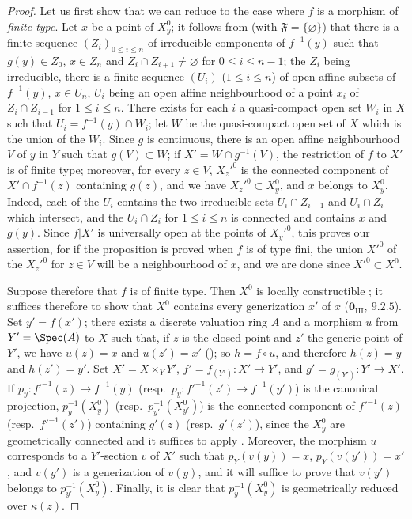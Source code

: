 \begin{proof}
Let us first show that we can reduce to the case where $f$ is a morphism of \emph{finite type}.
Let $x$ be a point of $X_y^0$; it follows from  (with $\mathfrak{F}=\{\varnothing\}$) that there is a finite sequence $(Z_i)_{0\leq i\leq n}$ of irreducible components of $f^{-1}(y)$ such that $g(y)\in Z_0$, $x\in Z_n$ and $Z_i\cap Z_{i+1}\neq\varnothing$ for $0\leq i\leq n-1$; the $Z_i$ being irreducible, there is a finite sequence $(U_i)$ ($1\leq i\leq n$) of open affine subsets of $f^{-1}(y)$, $x\in U_n$, $U_i$ being an open affine neighbourhood of a point $x_i$ of $Z_i\cap Z_{i-1}$ for $1\leq i\leq n$.
There exists for each $i$ a quasi-compact open set $W_i$ in $X$ such that $U_i=f^{-1}(y)\cap W_i$; let $W$ be the quasi-compact open set of $X$ which is the union of the $W_i$.
Since $g$ is continuous, there is an open affine neighbourhood $V$ of $y$ in $Y$ such that $g(V)\subset W$; if $X'=W\cap g^{-1}(V)$, the restriction of $f$ to $X'$ is of finite type; moreover, for every $z\in V$, $X_z'^0$ is the connected component of $X'\cap f^{-1}(z)$ containing $g(z)$, and we have $X_z'^0\subset X_y^0$, and $x$ belongs to $X_y^0$.
Indeed, each of the $U_i$ contains the two irreducible sets $U_i\cap Z_{i-1}$
and $U_i\cap Z_i$ which intersect, and the $U_i\cap Z_i$ for $1\leq i\leq n$ is connected and contains $x$ and $g(y)$.
Since $f|X'$ is universally open at the points of $X_y'^0$, this proves our assertion, for if the proposition is proved when $f$ is of type fini, the union $X'^0$ of the $X_z'^0$ for $z\in V$ will be a neighbourhood of $x$, and we are done since $X'^0\subset X^0$.

Suppose therefore that $f$ is of finite type.
Then $X^0$ is locally constructible ; it suffices therefore to show that $X^0$ contains every generization $x'$ of $x$ ($\mathbf{0}_{\mathrm{III}},~9.2.5$).
Set $y'=f(x')$; there exists a discrete valuation ring $A$ and a morphism $u$ from $Y'=\Spec(A)$ to $X$ such that, if $z$ is the closed point and $z'$ the generic point of $Y'$, we have $u(z)=x$ and $u(z')=x'$ (); so $h=f\circ u$, and therefore $h(z)=y$ and $h(z')=y'$.
Set $X'=X\times_Y Y'$, $f'=f_{(Y')}:X'\to Y'$, and $g'=g_{(Y')}:Y'\to X'$.
If $p_y:f'^{-1}(z)\to f^{-1}(y)$ (resp.\ $p_y:f'^{-1}(z')\to f^{-1}(y')$) is the canonical projection, $p_y^{-1}(X_y^0)$ (resp.\ $p_{y'}^{-1}(X_{y'}^0)$) is the connected component of $f'^{-1}(z)$ (resp.\ $f'^{-1}(z')$) containing $g'(z)$ (resp.\ $g'(z')$), since the $X_y^0$ are geometrically connected  and it suffices to apply .
Moreover, the morphism $u$ corresponds to a $Y'$-section $v$ of $X'$ such that $p_Y(v(y))=x$, $p_Y(v(y'))=x'$, and $v(y')$ is a generization of $v(y)$, and it will suffice to prove that $v(y')$ belongs to $p_{y'}^{-1}(X_y^0)$.
Finally, it is clear that $p_y^{-1}(X_y^0)$ is geometrically reduced over $\kappa(z)$.


\end{proof}
